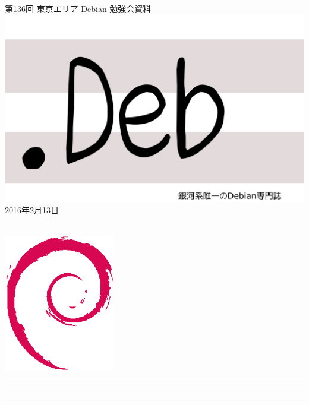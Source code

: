 \documentclass[mingoth,a4paper]{jsarticle}
\newcommand{\debmtgyear}{2016}
\newcommand{\debmtgmonth}{2}
\newcommand{\debmtgdate}{13}
\newcommand{\debmtgnumber}{136}
\begin{document}
\begin{titlepage}
\thispagestyle{empty}

\vspace*{-2cm}
第\debmtgnumber{}回 東京エリア Debian 勉強会資料\\
\hspace*{-2cm}
\includegraphics{image2012-natsu/dotdeb.pdf}\\
\hfill{}\debmtgyear{}年\debmtgmonth{}月\debmtgdate{}日

\\

\vspace*{-2cm}
\hfill{}\includegraphics[height=6cm]{image200502/openlogo-nd.eps}
\end{titlepage}

\newpage

\begin{minipage}[b]{0.2\hsize}
 \colorbox{titleback}{}
\end{minipage}
\begin{minipage}[b]{0.8\hsize}
\hrule
\vspace{2mm}
\hrule
\begin{multicols}{2}
\tableofcontents
\end{multicols}
\vspace{2mm}
\hrule
\end{minipage}
\end{document}
